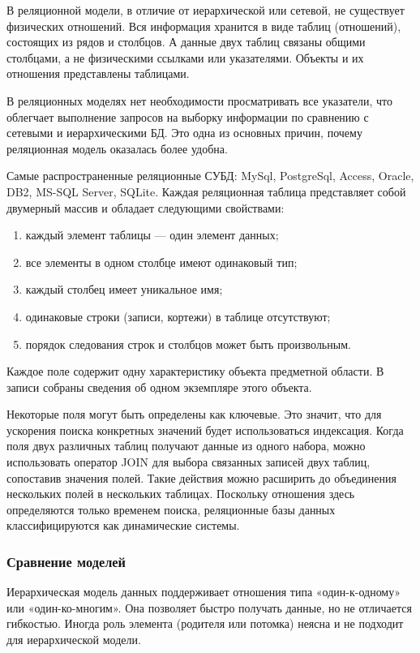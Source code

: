В реляционной модели, в отличие от иерархической или сетевой, не существует физических отношений. Вся информация хранится в виде таблиц (отношений), состоящих из рядов и столбцов. А данные двух таблиц связаны общими столбцами, а не физическими ссылками или указателями. Объекты и их отношения представлены таблицами.

В реляционных моделях нет необходимости просматривать все указатели, что облегчает выполнение запросов на выборку информации по сравнению с сетевыми и иерархическими БД. Это одна из основных причин, почему реляционная модель оказалась более удобна.

Самые распространенные реляционные СУБД: MySql, PostgreSql, Access, Oracle, DB2, MS-SQL Server, SQLite.
Каждая реляционная таблица представляет собой двумерный массив и обладает следующими свойствами:

\begin{enumerate}
	\item каждый элемент таблицы — один элемент данных;
	\item все элементы в одном столбце имеют одинаковый тип;
	\item каждый столбец имеет уникальное имя;
	\item одинаковые строки (записи, кортежи) в таблице отсутствуют;
	\item порядок следования строк и столбцов может быть произвольным.
\end{enumerate}


Каждое поле содержит одну характеристику объекта предметной области. В записи собраны сведения об одном экземпляре этого объекта.

Некоторые поля могут быть определены как ключевые. Это значит, что для ускорения поиска конкретных значений будет использоваться индексация. Когда поля двух различных таблиц получают данные из одного набора, можно использовать оператор JOIN для выбора связанных записей двух таблиц, сопоставив значения полей. Такие действия можно расширить до объединения нескольких полей в нескольких таблицах. Поскольку отношения здесь определяются только временем поиска, реляционные базы данных классифицируются как динамические системы. 

\subsubsection*{Сравнение моделей}

Иерархическая модель данных поддерживает отношения типа «один-к-одному» или «один-ко-многим». Она позволяет быстро получать данные, но не отличается гибкостью. Иногда роль элемента (родителя или потомка) неясна и не подходит для иерархической модели.

